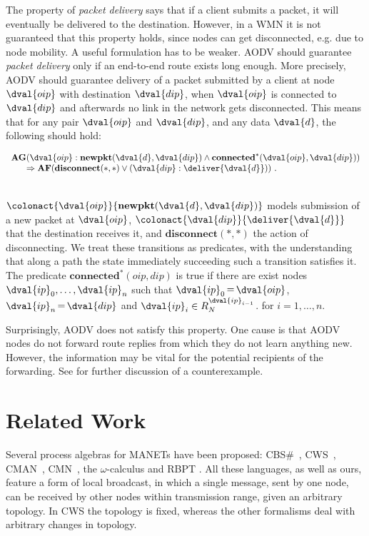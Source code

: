 \documentclass[envcountsame,envcountsect,orivec,runningheads]{llncs}
\begin{document}
The property of \emph{packet delivery} says that if a client submits a
packet, it will eventually be delivered to the destination. However, in a WMN 
it is not guaranteed that this property holds, since nodes can get
disconnected, e.g. due to node mobility. A useful formulation has to be weaker. AODV should 
guarantee \emph{packet delivery} only if an end-to-end route
exists long enough. More precisely, AODV should
guarantee delivery of a packet submitted by a client at node
$\dval{oip}$ with destination $\dval{dip}$, when $\dval{oip}$ is
connected to $\dval{dip}$ and afterwards no link in the network gets
disconnected. This means that for any pair $\dval{oip}$ and
$\dval{dip}$, and any data $\dval{d}$, the following should
hold:\\[1mm]
\centerline{$\begin{array}{r@{}l}
    \mathbf{AG}&(\dval{oip}:{\bf newpkt}(\dval{d},\dval{dip}) \wedge \textbf{connected}^*(\dval{oip},\dval{dip}))\\
    &\Rightarrow \mathbf{AF} (\textbf{disconnect}(*,*) \vee(\dval{dip}:\deliver{\dval{d}}))\ .
\end{array}$}\\[0.5mm]
$\colonact{\dval{oip}}{{\bf newpkt}(\dval{d},\dval{dip})}$ models
submission of a new packet at $\dval{oip}$,
$\colonact{\dval{dip}}{\deliver{\dval{d}}}$ that the destination
receives it, and $\textbf{disconnect}(*,*)$ the action of
disconnecting. We treat these transitions as predicates, with the
understanding that along a path the state immediately succeeding such
a transition satisfies it. The predicate
$\textbf{connected}^*(oip,dip)$ is true if there are exist nodes
$\dval{ip}_0,\ldots,\dval{ip}_n$ such that
$\dval{ip}_0\mathop=\dval{oip}$, $\dval{ip}_n\mathop=\dval{dip}$ and
$\dval{ip}_{i}\in\RN{\dval{ip}_{i-1}}$. 
for $i\mathop=1,\ldots,n$.


Surprisingly, AODV does not satisfy this property.
One cause is that AODV nodes do not forward route replies from which
they do not learn anything new. However, the information may be vital
for the potential recipients of the forwarding.
See \cite[Sect.\ 8]{TR11} for further discussion of a counterexample.

\section{Related Work}\label{sec:related_work}
Several process algebras for MANETs have been proposed:
CBS\#~\cite{NH06},
CWS~\cite{CWS},
CMAN~\cite{G07},
CMN~\cite{CMN},
the $\omega$-calculus \cite{SRS10}
and RBPT \cite{RBPT}.
All these languages, as well as ours, feature a form of local
broadcast, in which a single message, sent by one node, can be
received by other nodes within transmission range, given an arbitrary
topology.  In CWS the topology is fixed, whereas the other formalisms
deal with arbitrary changes in topology.
\end{document}
